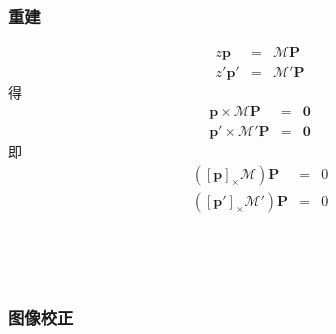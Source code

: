 \documentclass{beamer}
\newcommand{\tmmathbf}[1]{\ensuremath{\boldsymbol{#1}}}
\begin{document}
{{\begin{frame}
\end{frame}}{\begin{frame}
  \frametitle{重建}
  \begin{eqnarray*}
    z\tmmathbf{p} & = & \mathcal{M}\tmmathbf{P}\\
    z' \tmmathbf{p}' & = & \mathcal{M}' \tmmathbf{P}
  \end{eqnarray*}
  得
  \begin{eqnarray*}
    \tmmathbf{p} \times \mathcal{M}\tmmathbf{P} & = & \tmmathbf{0}\\
    \tmmathbf{p}' \times \mathcal{M}' \tmmathbf{P} & = & \tmmathbf{0}
  \end{eqnarray*}
  即
  \begin{eqnarray*}
    ([\tmmathbf{p}]_{\times} \mathcal{M}) \tmmathbf{P} & = & 0\\
    ([\tmmathbf{p}']_{\times} \mathcal{M}') \tmmathbf{P} & = & 0
  \end{eqnarray*}
\end{frame}}{\begin{frame}
  \
  
  \
  
\end{frame}}{\begin{frame}
  \frametitle{图像校正}
  

\end{frame}}}
\end{document}
